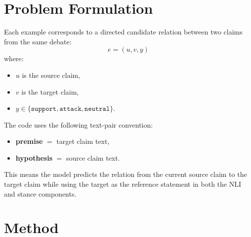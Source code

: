 \documentclass[11pt,a4paper]{article}
\begin{document}
\section{Problem Formulation}
Each example corresponds to a directed candidate relation between two claims from the same debate:
\begin{equation}
e = (u, v, y)
\end{equation}
where:
\begin{itemize}[leftmargin=1.5em]
  \item \(u\) is the source claim,
  \item \(v\) is the target claim,
  \item \(y \in \{\texttt{support}, \texttt{attack}, \texttt{neutral}\}\).
\end{itemize}

The code uses the following text-pair convention:
\begin{itemize}[leftmargin=1.5em]
  \item \textbf{premise} \(=\) target claim text,
  \item \textbf{hypothesis} \(=\) source claim text.
\end{itemize}

This means the model predicts the relation from the current source claim to the target claim while using the target as the reference statement in both the NLI and stance components.

\section{Method}
\end{document}
